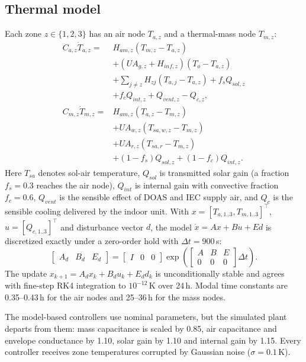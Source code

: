 \subsection{Thermal model}
Each zone $z\in\{1,2,3\}$ has an air node $T_{a,z}$ and a thermal-mass node $T_{m,z}$:
\begin{align}
C_{a,z}\dot T_{a,z} ={}& H_{am,z}(T_{m,z}-T_{a,z}) \nonumber\\
  &+ (UA_{g,z}+H_{inf,z})(T_o-T_{a,z}) \nonumber\\
  &+ \textstyle\sum_{j\neq z} H_{zj}(T_{a,j}-T_{a,z}) + f_s Q_{sol,z} \nonumber\\
  &+ f_c Q_{int,z} + Q_{vent,z} - Q_{c,z}, \label{eq:air}\\
C_{m,z}\dot T_{m,z} ={}& H_{am,z}(T_{a,z}-T_{m,z}) \nonumber\\
  &+ UA_{w,z}(T_{sa,w,z}-T_{m,z}) \nonumber\\
  &+ UA_{r,z}(T_{sa,r}-T_{m,z}) \nonumber\\
  &+ (1-f_s)Q_{sol,z} + (1-f_c)Q_{int,z}. \label{eq:mass}
\end{align}
Here $T_{sa}$ denotes sol-air temperature, $Q_{sol}$ is transmitted solar gain (a
fraction $f_s=0.3$ reaches the air node), $Q_{int}$ is internal gain with convective
fraction $f_c=0.6$, $Q_{vent}$ is the sensible effect of DOAS and IEC supply air, and
$Q_c$ is the sensible cooling delivered by the indoor unit. With
$x=[T_{a,1..3},T_{m,1..3}]^\top$, $u=[Q_{c,1..3}]^\top$ and disturbance vector $d$, the
model $\dot x=Ax+Bu+Ed$ is discretized exactly under a zero-order hold with
$\Delta t=900$\,s:
\begin{equation}
\begin{bmatrix}A_d & B_d & E_d\end{bmatrix}
=\begin{bmatrix}I&0&0\end{bmatrix}
\exp\!\left(\begin{bmatrix}A&B&E\\0&0&0\end{bmatrix}\Delta t\right).
\label{eq:zoh}
\end{equation}
The update $x_{k+1}=A_dx_k+B_du_k+E_dd_k$ is unconditionally stable and agrees with
fine-step RK4 integration to $10^{-12}$\,K over 24\,h. Modal time constants are
0.35--0.43\,h for the air nodes and 25--36\,h for the mass nodes.

The model-based controllers use nominal parameters, but the simulated plant departs
from them: mass capacitance is scaled by 0.85, air capacitance and envelope
conductance by 1.10, solar gain by 1.10 and internal gain by 1.15. Every controller
receives zone temperatures corrupted by Gaussian noise ($\sigma=0.1$\,K).

